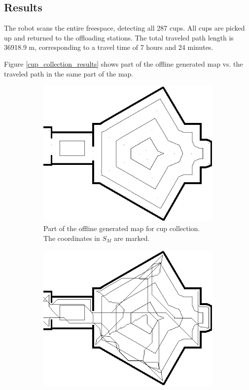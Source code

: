 \subsection{Results}
The robot scans the entire freespace, detecting all 287 cups.
All cups are picked up and returned to the offloading stations.
The total traveled path length is 36918.9 m, corresponding to a travel time of 7 hours and 24 minutes.

Figure \ref{cup_collection_results} shows part of the offline generated map vs. the traveled path in the same part of the map.

\begin{figure}[ht]
\centering
  \begin{subfigure}[t]{0.3\textwidth}
    \includegraphics[width = \textwidth]{graphics/cup_collect_plan}
    \caption{Part of the offline generated map for cup collection. The coordinates in \(S_{M}\) are marked.}
    \label{cup_collect_plan}
  \end{subfigure}
  \begin{subfigure}[t]{0.3\textwidth}
    \includegraphics[width = \textwidth]{graphics/cup_collect_robot}

\end{subfigure}
\end{figure}
